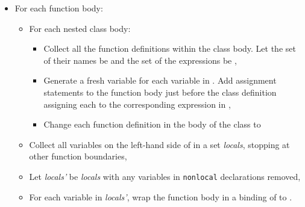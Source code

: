 \documentclass[10pt]{sigplanconf}
\newcommand{\Scribtexttt}[1]{{\texttt{#1}}}
\newlength{\stabLeft}
\newcommand{\atItemizeStart}[0]{\addtolength{\stabLeft}{\labelsep}
                                \addtolength{\stabLeft}{\labelwidth}}
\begin{document}
\begin{itemize}\atItemizeStart

\item For each function body:

\begin{itemize}\atItemizeStart

\item For each nested class body:


\noindent \begin{itemize}\atItemizeStart

\item Collect all the function definitions within the class body.
Let the set of their names be  and the set of the
expressions be ,

\item Generate a fresh variable  for each variable in
.  Add assignment statements to the function body just
before the class definition assigning each  to the
corresponding expression in ,

\item Change each function definition in the body of the class to
\end{itemize}

\item Collect all variables on the left{-}hand side of  in a set \textit{locals}, stopping at other function boundaries,

\item Let \textit{locals{'}} be \textit{locals} with any variables in
\Scribtexttt{nonlocal} declarations removed,

\item For each variable  in \textit{locals{'}}, wrap the
function body in a binding of  to .\end{itemize}\end{itemize}
\end{document}
